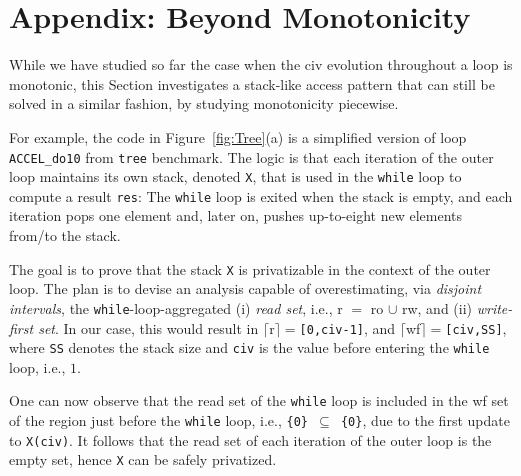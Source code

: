 \documentclass{sig-alternate}
\begin{document}
%

\begin{small}

\end{small}

\newpage

\section{Appendix: Beyond Monotonicity} %
\label{sec:Stack}

While we have studied so far the case when the {\sc civ} evolution
throughout a loop is monotonic, this Section investigates a stack-like 
access pattern that can still be solved in a similar fashion, by 
studying monotonicity piecewise.
 
For example, the code in Figure~\ref{fig:Tree}(a) is a simplified
version of loop {\tt ACCEL\_do10} from {\tt tree} benchmark. 
The logic is that each iteration of the outer loop maintains its own
stack, denoted {\tt X}, that is used in the {\tt while} loop to 
compute a result {\tt res}:
The {\tt while} loop is exited when the stack is empty, and each
iteration pops one element and, later on, pushes
up-to-eight new elements from/to the stack. 

The goal is to prove that the stack {\tt X} is privatizable in the
context of the outer loop.   The plan is to devise an analysis
capable of overestimating, via {\em disjoint intervals}, the   %
{\tt while}-loop-aggregated (i) {\em read set}, i.e., 
{\sc r} $=$ {\sc ro} $\cup$ {\sc rw}, and (ii) {\em write-first set}. 
In our case, this would result in  
$\lceil${\sc r}$\rceil=${\tt[0,civ-1]}, and
$\lceil${\sc wf}$\rceil=${\tt[civ,SS]}, where {\tt SS} denotes
the stack size and  {\tt civ} is the value before entering the 
{\tt while} loop, i.e., $1$.  

One can now observe that the read set of the {\tt while} loop 
is included in the {\sc wf} set of the region just before the 
{\tt while} loop, i.e., {\tt \{0\} $\subseteq$ \{0\}}, due to the 
first update to {\tt X(civ)}. It follows that the read set of
each iteration of the outer loop is the empty set, 
hence {\tt X} can be safely privatized. 
\end{document}
